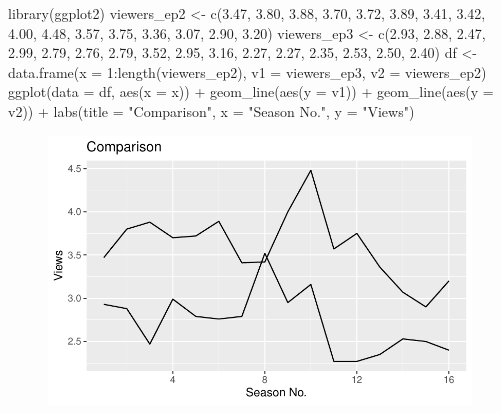 \documentclass[
  letterpaper,
  DIV=11,
  numbers=noendperiod]{scrartcl}
\newenvironment{Shaded}{\begin{snugshade}}{\end{snugshade}}
\newcommand{\AttributeTok}[1]{\textcolor[rgb]{0.40,0.45,0.13}{#1}}
\newcommand{\DecValTok}[1]{\textcolor[rgb]{0.68,0.00,0.00}{#1}}
\newcommand{\FloatTok}[1]{\textcolor[rgb]{0.68,0.00,0.00}{#1}}
\newcommand{\FunctionTok}[1]{\textcolor[rgb]{0.28,0.35,0.67}{#1}}
\newcommand{\NormalTok}[1]{\textcolor[rgb]{0.00,0.23,0.31}{#1}}
\newcommand{\OtherTok}[1]{\textcolor[rgb]{0.00,0.23,0.31}{#1}}
\newcommand{\SpecialCharTok}[1]{\textcolor[rgb]{0.37,0.37,0.37}{#1}}
\newcommand{\StringTok}[1]{\textcolor[rgb]{0.13,0.47,0.30}{#1}}
\begin{document}
\begin{Shaded}
\begin{Highlighting}[]
\FunctionTok{library}\NormalTok{(ggplot2)}
\NormalTok{viewers\_ep2 }\OtherTok{\textless{}{-}} \FunctionTok{c}\NormalTok{(}\FloatTok{3.47}\NormalTok{, }\FloatTok{3.80}\NormalTok{, }\FloatTok{3.88}\NormalTok{, }\FloatTok{3.70}\NormalTok{, }\FloatTok{3.72}\NormalTok{, }\FloatTok{3.89}\NormalTok{, }\FloatTok{3.41}\NormalTok{, }\FloatTok{3.42}\NormalTok{, }\FloatTok{4.00}\NormalTok{, }\FloatTok{4.48}\NormalTok{, }\FloatTok{3.57}\NormalTok{, }\FloatTok{3.75}\NormalTok{, }\FloatTok{3.36}\NormalTok{, }\FloatTok{3.07}\NormalTok{, }\FloatTok{2.90}\NormalTok{, }\FloatTok{3.20}\NormalTok{)}
\NormalTok{viewers\_ep3 }\OtherTok{\textless{}{-}} \FunctionTok{c}\NormalTok{(}\FloatTok{2.93}\NormalTok{, }\FloatTok{2.88}\NormalTok{, }\FloatTok{2.47}\NormalTok{, }\FloatTok{2.99}\NormalTok{, }\FloatTok{2.79}\NormalTok{, }\FloatTok{2.76}\NormalTok{, }\FloatTok{2.79}\NormalTok{, }\FloatTok{3.52}\NormalTok{, }\FloatTok{2.95}\NormalTok{, }\FloatTok{3.16}\NormalTok{, }\FloatTok{2.27}\NormalTok{, }\FloatTok{2.27}\NormalTok{, }\FloatTok{2.35}\NormalTok{, }\FloatTok{2.53}\NormalTok{, }\FloatTok{2.50}\NormalTok{, }\FloatTok{2.40}\NormalTok{)}
\NormalTok{df }\OtherTok{\textless{}{-}} \FunctionTok{data.frame}\NormalTok{(}\AttributeTok{x =} \DecValTok{1}\SpecialCharTok{:}\FunctionTok{length}\NormalTok{(viewers\_ep2), }\AttributeTok{v1 =}\NormalTok{ viewers\_ep3, }\AttributeTok{v2 =}\NormalTok{ viewers\_ep2)}
\FunctionTok{ggplot}\NormalTok{(}\AttributeTok{data =}\NormalTok{ df, }\FunctionTok{aes}\NormalTok{(}\AttributeTok{x =}\NormalTok{ x)) }\SpecialCharTok{+}
  \FunctionTok{geom\_line}\NormalTok{(}\FunctionTok{aes}\NormalTok{(}\AttributeTok{y =}\NormalTok{ v1)) }\SpecialCharTok{+}
  \FunctionTok{geom\_line}\NormalTok{(}\FunctionTok{aes}\NormalTok{(}\AttributeTok{y =}\NormalTok{ v2)) }\SpecialCharTok{+}
  \FunctionTok{labs}\NormalTok{(}\AttributeTok{title =} \StringTok{"Comparison"}\NormalTok{, }\AttributeTok{x =} \StringTok{"Season No."}\NormalTok{, }\AttributeTok{y =} \StringTok{"Views"}\NormalTok{)}
\end{Highlighting}
\end{Shaded}

\begin{figure}[H]

{\centering \includegraphics{MD_1_assignment_files/figure-pdf/unnamed-chunk-2-1.pdf}

}

\end{figure}
\end{document}
